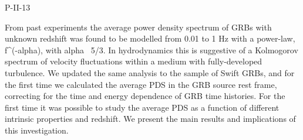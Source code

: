 P-II-13


\bigskip



\bigskip

\noindent From past experiments the average power density spectrum of GRBs with unknown redshift was found to be modelled from 0.01 to 1 Hz with a power-law, f^(-alpha), with alpha ~5/3. In hydrodynamics this is suggestive of a Kolmogorov spectrum of velocity fluctuations within a medium with
fully-developed turbulence. We updated the same analysis to the sample of Swift GRBs, and for the first time we calculated the average PDS in the GRB source rest frame, correcting for the time and energy dependence of GRB time histories.
For the first time it was possible to study the average PDS as a function of different intrinsic properties and redshift.
We present the main results and implications of this investigation.


